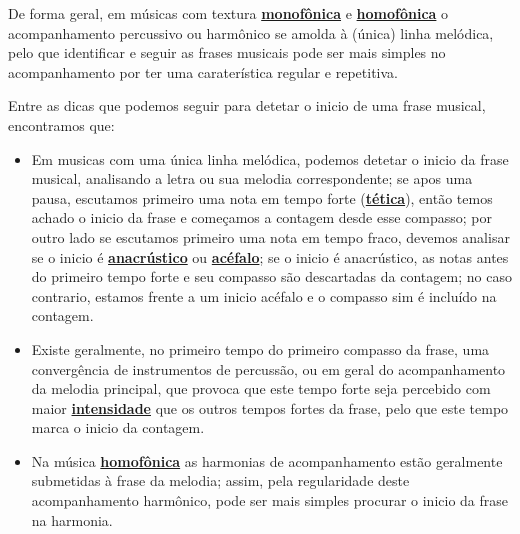 

De forma geral, em músicas com textura \hyperref[subsec:monofonica]{\textbf{monofônica}} 
e \hyperref[subsec:homofonica]{\textbf{homofônica}} o acompanhamento percussivo ou harmônico 
se amolda à (única) linha melódica, 
pelo que identificar e seguir  as frases musicais pode ser mais simples no acompanhamento 
por ter uma caraterística regular e repetitiva.


\label{pos:detetandoiniciofrase}
Entre as dicas que podemos seguir para detetar o inicio de uma frase musical, encontramos que:
\begin{itemize}
\item Em musicas com uma única linha melódica, podemos detetar o inicio da frase musical,
analisando a letra ou sua melodia correspondente;
se apos uma pausa, escutamos primeiro uma nota em tempo forte (\hyperref[subsub:Tetico]{\textbf{tética}}),
então temos achado o inicio da frase e começamos a contagem desde esse compasso;
por outro lado se escutamos primeiro uma nota em tempo fraco,
devemos analisar se o inicio é \hyperref[subsub:anacrustica]{\textbf{anacrústico}} ou 
\hyperref[subsub:Acefalo]{\textbf{acéfalo}}; 
se o inicio é anacrústico, 
as notas antes do primeiro tempo forte e seu compasso são descartadas da contagem;
no caso contrario, estamos frente a um inicio acéfalo e o compasso sim é incluído na contagem. 
\item Existe geralmente, no primeiro tempo do primeiro compasso da frase, 
uma convergência de instrumentos de percussão, ou em geral do acompanhamento da melodia principal,
que provoca que este tempo forte seja percebido com maior \hyperref[sec:pos:Intensidade]{\textbf{intensidade}} 
que os outros tempos fortes da frase,
pelo que este tempo marca o inicio da contagem.
\item Na música \hyperref[subsec:homofonica]{\textbf{homofônica}} as harmonias de acompanhamento estão geralmente submetidas
à frase da melodia; assim, pela regularidade deste acompanhamento harmônico,
pode ser mais simples procurar o inicio da frase na harmonia.
\end{itemize}

